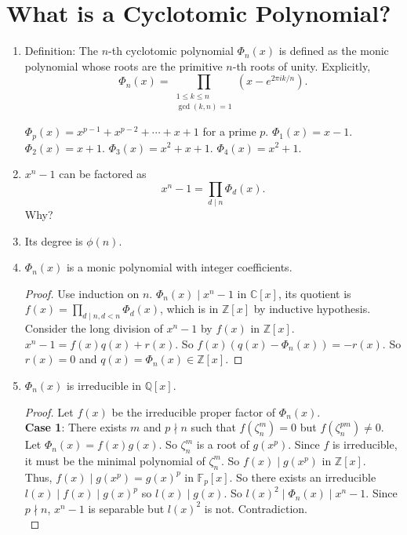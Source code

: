 \documentclass[20pt]{scrartcl}
\newcommand{\Q}{\mathbb{Q}}
\newcommand{\Z}{\mathbb{Z}}
\newcommand{\C}{\mathbb{C}}
\newcommand{\F}{\mathbb{F}}
\begin{document}
\section{What is a Cyclotomic Polynomial?}
\begin{enumerate}
    \item Definition: The $n$-th cyclotomic polynomial $\Phi_n(x)$ is defined as the monic polynomial whose roots are the primitive $n$-th roots of unity. Explicitly,
    \[\Phi_n(x) = \prod_{\substack{1 \leq k \leq n \\ \gcd(k,n) = 1}} \left(x - e^{2\pi i k/n}\right).\]
    \begin{example}
    $\Phi_p(x) = x^{p-1} + x^{p-2} + \cdots + x + 1$ for a prime $p$.
    $\Phi_1(x) = x - 1$.
    $\Phi_2(x) = x + 1$.
    $\Phi_3(x) = x^2 + x + 1$.
    $\Phi_4(x) = x^2 + 1$.
    \end{example}
    \item $x^n - 1$ can be factored as
    \[x^n - 1 = \prod_{d \mid n} \Phi_d(x).\]
    Why?
    \item Its degree is $\phi(n)$. 
    \item $\Phi_n(x)$ is a monic polynomial with integer coefficients. 
    \begin{proof}
        Use induction on $n$. $\Phi_n(x)\mid x^n-1$ in $\C[x]$, its quotient is $f(x) = \prod_{d\mid n, d < n} \Phi_d(x)$, which is in $\Z[x]$ by inductive hypothesis. Consider the long division of $x^n-1$ by $f(x)$ in $\Z[x]$. $x^n-1=f(x)q(x)+r(x)$. 
        So $f(x)(q(x)-\Phi_n(x))=-r(x)$. So $r(x)=0$ and $q(x)=\Phi_n(x)\in \Z[x]$.
    \end{proof}
    \item $\Phi_n(x)$ is irreducible in $\Q[x]$. 
    \begin{proof}
    Let $f(x)$ be the irreducible proper factor of $\Phi_n(x)$.
    \\

    \textbf{Case 1}: There exists $m$ and $p\nmid n$ such that $f(\zeta_n^m)=0$ but $f(\zeta_n^{pm})\neq 0$. 
    \\

    Let $\Phi_n(x)=f(x)g(x)$. So $\zeta_n^m$ is a root of $g(x^p)$. 
    Since $f$ is irreducible, it must be the minimal polynomial 
    of $\zeta_n^m$. So $f(x)\mid g(x^p)$ in $\Z[x]$. 
    \\
    Thus, $f(x)\mid g(x^p)=g(x)^p $ in $\F_p[x]$. So there exists an irreducible $l(x)\mid f(x)\mid g(x)^p$ so $l(x)\mid g(x)$. So $l(x)^2\mid \Phi_n(x)\mid x^n-1$. 
    Since $p\nmid n$, $x^n-1$ is separable but $l(x)^2$ is not. Contradiction. 
    \\


\end{proof}
\end{enumerate}
\end{document}
